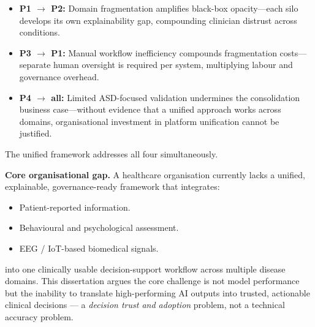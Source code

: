 \begin{itemize}[leftmargin=*, itemsep=3pt]
    \item \textbf{P1 $\to$ P2:} Domain fragmentation amplifies black-box opacity---each silo develops its own explainability gap, compounding clinician distrust across conditions.
    \item \textbf{P3 $\to$ P1:} Manual workflow inefficiency compounds fragmentation costs---separate human oversight is required per system, multiplying labour and governance overhead.
    \item \textbf{P4 $\to$ all:} Limited ASD-focused validation undermines the consolidation business case---without evidence that a unified approach works across domains, organisational investment in platform unification cannot be justified.
\end{itemize}


\noindent The unified framework addresses all four simultaneously.

\noindent\textbf{Core organisational gap.} A healthcare organisation currently lacks a unified, explainable, governance-ready framework that integrates:
\begin{itemize}[leftmargin=*, itemsep=2pt]
    \item Patient-reported information.
    \item Behavioural and psychological assessment.
    \item EEG / IoT-based biomedical signals.
\end{itemize}
\noindent into one clinically usable decision-support workflow across multiple disease domains. This dissertation argues the core challenge is not model performance but the inability to translate high-performing AI outputs into trusted, actionable clinical decisions --- a \emph{decision trust and adoption} problem, not a technical accuracy problem.

